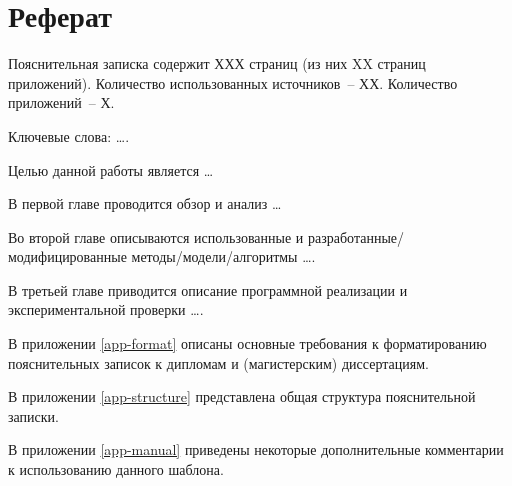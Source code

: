 \chapter*{Реферат}
\thispagestyle{plain}

Пояснительная записка содержит ХХХ  страниц (из них XX страниц приложений).   Количество использованных источников~-- ХХ. Количество приложений~-- Х.

Ключевые слова: \dots .

Целью данной работы является \dots

В первой главе проводится обзор и анализ \dots 

Во второй главе описываются использованные и разработанные/модифицированные методы/модели/алгоритмы \dots. 

В третьей главе приводится описание программной реализации и экспериментальной проверки \dots.

В приложении \ref{app-format} описаны основные требования к форматированию пояснительных записок к дипломам и (магистерским) диссертациям.

В приложении \ref{app-structure} представлена общая структура пояснительной записки.

В приложении \ref{app-manual} приведены некоторые дополнительные комментарии к использованию данного шаблона.